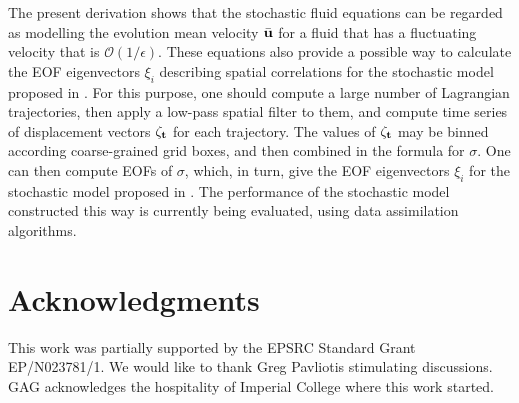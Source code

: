 \documentclass[12pt,onesided]{article}
\def\u{{\bf{u}}}
\begin{document}
The present 
derivation shows that the stochastic fluid equations can be regarded 
as modelling the evolution mean velocity $\bar{{\u}}$ for a fluid that
has a fluctuating velocity that is $\mathcal{O}(1/\epsilon)$. These equations
also provide a possible way to calculate the EOF eigenvectors $\xi_i$ describing spatial correlations  for the stochastic model proposed in \cite{Holm15,CrFlHo2017}. For this purpose, one should compute a large number of Lagrangian trajectories, 
then apply a low-pass spatial filter to them, and compute time series of displacement vectors ${\bf \zeta_t}$ for each trajectory. The values of ${\bf \zeta_t }$ may be binned according coarse-grained grid boxes, and then combined in the formula for $\sigma$.
One can then compute EOFs of $\sigma$, which, in turn, give the EOF eigenvectors $\xi_i$ for the stochastic model proposed in \cite{Holm15,CrFlHo2017}.
The performance of the stochastic model constructed this way is currently
being evaluated, using data assimilation algorithms.



\section*{Acknowledgments}
This work was partially supported by the EPSRC Standard Grant EP/N023781/1. We would like to thank Greg Pavliotis stimulating discussions. GAG acknowledges the hospitality of Imperial College where this work started.





%
%

\end{document}
